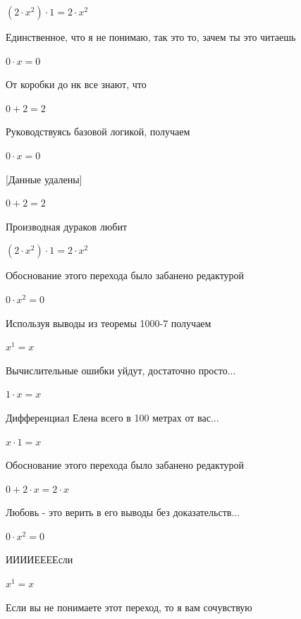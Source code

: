 \documentclass[12pt,a4paper,fleqn]{article}
\begin{document}
\begin{center}
$(2 \cdot x^{2}) \cdot 1 = 2 \cdot x^{2}$\end{center}
Единственное, что я не понимаю, так это то, зачем ты это читаешь

\begin{center}
$0 \cdot x = 0$\end{center}
От коробки до нк все знают, что

\begin{center}
$0+2 = 2$\end{center}
Руководствуясь базовой логикой, получаем

\begin{center}
$0 \cdot x = 0$\end{center}
[Данные удалены]

\begin{center}
$0+2 = 2$\end{center}
Производная дураков любит\cite{link2}

\begin{center}
$(2 \cdot x^{2}) \cdot 1 = 2 \cdot x^{2}$\end{center}
Обоснование этого перехода было забанено редактурой

\begin{center}
$0 \cdot x^{2} = 0$\end{center}
Используя выводы из теоремы 1000-7 получаем

\begin{center}
$x^{1} = x$\end{center}
Вычислительные ошибки уйдут, достаточно просто...

\begin{center}
$1 \cdot x = x$\end{center}
Дифференциал Елена всего в 100 метрах от вас...

\begin{center}
$x \cdot 1 = x$\end{center}
Обоснование этого перехода было забанено редактурой

\begin{center}
$0+2 \cdot x = 2 \cdot x$\end{center}
Любовь - это верить в его выводы без доказательств...

\begin{center}
$0 \cdot x^{2} = 0$\end{center}
ИИИИЕЕЕЕсли\cite{link3}

\begin{center}
$x^{1} = x$\end{center}
Если вы не понимаете этот переход, то я вам сочувствую
\end{document}

